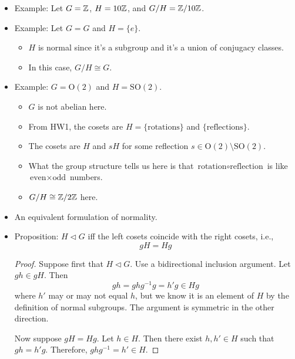 \documentclass[../notes.tex]{subfiles}
\begin{document}
\begin{itemize}
\begin{proof}
        Note that we get from the second to the third line above because $H$ is a normal subgroup, i.e., conjugates of its elements are elements of it. This implies the desired result.
    \end{proof}
    \item Example: Let $G=\mathbb{Z}$, $H=10\mathbb{Z}$, and $G/H=\mathbb{Z}/10\mathbb{Z}$.
    \item Example: Let $G=G$ and $H=\{e\}$.
    \begin{itemize}
        \item $H$ is normal since it's a subgroup and it's a union of conjugacy classes.
        \item In this case, $G/H\cong G$.
    \end{itemize}
    \item Example: $G=\text{O}(2)$ and $H=\text{SO}(2)$.
    \begin{itemize}
        \item $G$ is not abelian here.
        \item From HW1, the cosets are $H=\{\text{rotations}\}$ and $\{\text{reflections}\}$.
        \item The cosets are $H$ and $sH$ for some reflection $s\in\text{O}(2)\setminus\text{SO}(2)$.
        \item What the group structure tells us here is that $\text{rotation}\circ\text{reflection}$ is like $\text{even}\times\text{odd}$ numbers.
        \item $G/H\cong\mathbb{Z}/2\mathbb{Z}$ here.
    \end{itemize}
    \item An equivalent formulation of normality.
    \item Proposition: $H\triangleleft G$ iff the left cosets coincide with the right cosets, i.e.,
    \begin{equation*}
        gH = Hg
    \end{equation*}
    \begin{proof}
        Suppose first that $H\triangleleft G$. Use a bidirectional inclusion argument. Let $gh\in gH$. Then
        \begin{equation*}
            gh = ghg^{-1}g = h'g \in Hg
        \end{equation*}
        where $h'$ may or may not equal $h$, but we know it is an element of $H$ by the definition of normal subgroups. The argument is symmetric in the other direction.\par
        Now suppose $gH=Hg$. Let $h\in H$. Then there exist $h,h'\in H$ such that $gh=h'g$. Therefore, $ghg^{-1}=h'\in H$.

\end{proof}
\end{itemize}
\end{document}
